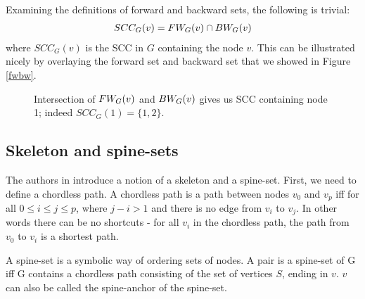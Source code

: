 \documentclass[../master/master.tex]{subfiles}
\begin{document}
\noindent Examining the definitions of forward and backward sets, the following is trivial:
\begin{align}
SCC_G(v) = FW_{G}(v) \cap BW_{G}(v) \label{scc}
\end{align} 
where $SCC_G(v)$ is the SCC in $G$ containing the node $v$. This can be illustrated nicely by overlaying the forward set and backward set that we showed in Figure \ref{fwbw}.


\begin{figure}[H]
\center
{}
\caption{Intersection of $FW_{G}(v)$ and $BW_{G}(v)$ gives us SCC containing node 1; indeed $SCC_G(1) = \{1,2\}$. } 
\end{figure}

\subsection{Skeleton and spine-sets}
The authors in \cite{linear} introduce a notion of a skeleton and a spine-set. First, we need to define a chordless path. A chordless path is a path between nodes $v_0$ and $v_p$ iff for all $0\leq i \leq j \leq p$, where $j-i>1$ and there is no edge from $v_i$ to $v_j$. In other words there can be no shortcuts - for all $v_i$ in the chordless path, the path from $v_0$ to $v_i$ is a shortest path.

A spine-set is a symbolic way of ordering sets of nodes. A pair  is a spine-set of G iff G contains a chordless path consisting of the set of vertices $S$, ending in $v$. $v$ can also be called the spine-anchor of the spine-set.
\end{document}

